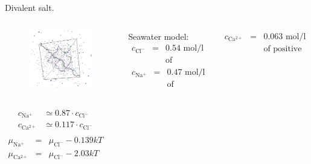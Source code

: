 \documentclass[10pt]{beamer}
\newcommand{\cl}{\mathrm{Cl^-}}
\newcommand{\na}{\mathrm{Na^+}}
\newcommand{\ca}{\mathrm{Ca^{2+}}}
\newcommand{\so}{\mathrm{SO_4^{2-}}}
\newcommand{\kT}{kT}
\begin{document}
\begin{frame}{Divalent salt. }
	\begin{columns}[T,onlytextwidth]%
			\begin{figure}
				\includegraphics[width=1\columnwidth]{figures/vmdscene.png}
			\end{figure} 		
			{\Large Seawater model: }
			\begin{eqnarray*}
				c_\cl&=&0.54\text{ mol/l} \\
				&&\text{of negative ions} 
			\end{eqnarray*}
			\begin{eqnarray*}
				c_\na&=&0.47\text{ mol/l} \\
				&&\text{of positive ions} 
			\end{eqnarray*}

			\begin{eqnarray*}
				c_\ca&=&0.063\text{ mol/l} \\
				&&\text{of positive divalent ions}  \\
			\end{eqnarray*}
		
	\end{columns}
	\begin{columns}[T,onlytextwidth]%
			\begin{eqnarray*}
				c_{\na}&\simeq0.87\cdot c_{\cl} \\
				c_{\ca}&\simeq0.117\cdot c_{\cl} \\
			\end{eqnarray*}
			\begin{eqnarray*}
				\mu_{\na}&=&\mu_{\cl} - 0.139\kT\\
				\mu_{\ca}&=&\mu_{\cl} - 2.03\kT\\
			\end{eqnarray*}	
	\end{columns}		
\end{frame}
\end{document}
